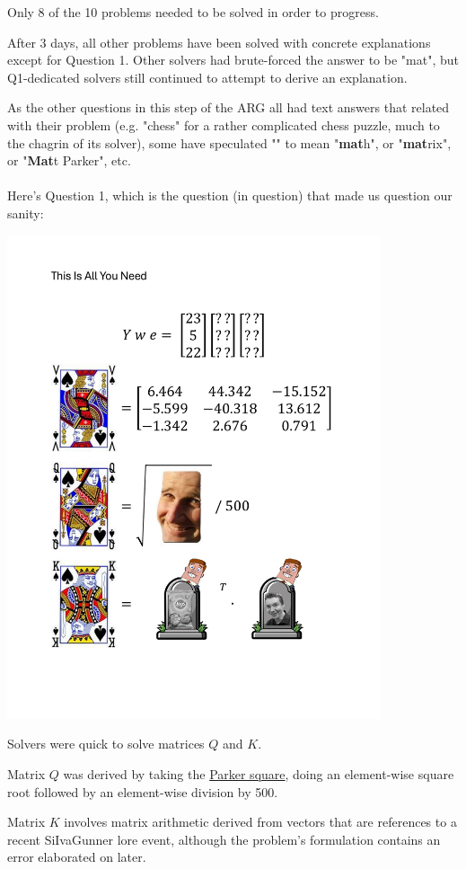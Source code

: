 \documentclass{article}
\begin{document}
Only 8 of the 10 problems needed to be solved in order to progress.

After 3 days, all other problems have been solved with concrete explanations except for Question 1. Other solvers had brute-forced the answer to be "mat", but Q1-dedicated solvers still continued to attempt to derive an explanation.

As the other questions in this step of the ARG all had text answers that related with their problem (e.g. "chess" for a rather complicated chess puzzle, much to the chagrin of its solver), some  have speculated "" to mean "\textbf{mat}h", or "\textbf{mat}rix", or "\textbf{Mat}t Parker", etc.
\\\\
Here's Question 1, which is the question (in question) that made us question our sanity:

\includegraphics[width=11cm]{1.pdf}

Solvers were quick to solve matrices $Q$ and $K$. 

Matrix $Q$ was derived by taking the \href{https://en.wikipedia.org/wiki/Magic_square#Parker_square}{Parker square}, doing an element-wise square root followed by an element-wise division by 500.

Matrix $K$ involves matrix arithmetic derived from vectors that are references to a recent SiIvaGunner lore event, although the problem's formulation contains an error elaborated on later.
\end{document}
